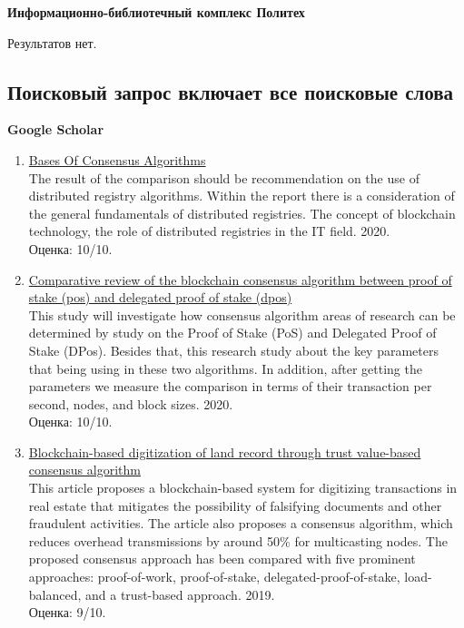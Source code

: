 \documentclass[a4paper, 12pt]{report}		%
\begin{document}
\textbf{Информационно-библиотечный комплекс Политех}

Результатов нет.

\subsection*{Поисковый запрос включает все поисковые слова}

\textbf{Google Scholar}

\begin{enumerate}
\item \href{https://www.kgmtu.ru/documents/nauka/SbornikEng2020.pdf#page=211}{Bases Of Consensus Algorithms}\\
The result of the comparison should be recommendation on the use of distributed registry algorithms. Within the report there is a consideration of the general fundamentals of distributed registries. The concept of blockchain technology, the role of distributed registries in the IT field. 2020.\\
Оценка: 10/10.
\item \href{https://ijic.utm.my/index.php/ijic/article/view/272}{Comparative review of the blockchain consensus algorithm between proof of stake (pos) and delegated proof of stake (dpos)}\\
This study will investigate how consensus algorithm areas of research can be determined by study on the Proof of Stake (PoS) and Delegated Proof of Stake (DPos). Besides that, this research study about the key parameters that being using in these two algorithms. In addition, after getting the parameters we measure the comparison in terms of their transaction per second, nodes, and block sizes. 2020.\\
Оценка: 10/10.
\item \href{https://link.springer.com/article/10.1007/s12083-021-01207-1}{Blockchain-based digitization of land record through trust value-based consensus algorithm}\\
This article proposes a blockchain-based system for digitizing transactions in real estate that mitigates the possibility of falsifying documents and other fraudulent activities. The article also proposes a consensus algorithm, which reduces overhead transmissions by around 50\% for multicasting nodes. The proposed consensus approach has been compared with five prominent approaches: proof-of-work, proof-of-stake, delegated-proof-of-stake, load-balanced, and a trust-based approach. 2019.\\
Оценка: 9/10.
\end{enumerate}
\end{document}
